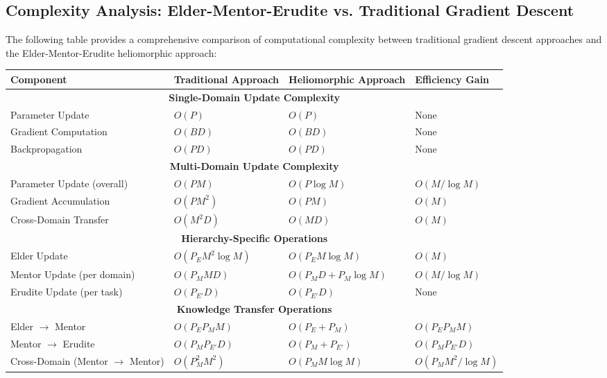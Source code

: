 \subsection{Complexity Analysis: Elder-Mentor-Erudite vs. Traditional Gradient Descent}

The following table provides a comprehensive comparison of computational complexity between traditional gradient descent approaches and the Elder-Mentor-Erudite heliomorphic approach:

\begin{table}[h]
\centering
\begin{tabular}{|p{3cm}|p{4.5cm}|p{4.5cm}|p{3cm}|}
\hline
\textbf{Component} & \textbf{Traditional Approach} & \textbf{Heliomorphic Approach} & \textbf{Efficiency Gain} \\
\hline
\multicolumn{4}{|c|}{\textbf{Single-Domain Update Complexity}} \\
\hline
Parameter Update & $O(P)$ & $O(P)$ & None \\
\hline
Gradient Computation & $O(BD)$ & $O(BD)$ & None \\
\hline
Backpropagation & $O(PD)$ & $O(PD)$ & None \\
\hline
\multicolumn{4}{|c|}{\textbf{Multi-Domain Update Complexity}} \\
\hline
Parameter Update (overall) & $O(PM)$ & $O(P \log M)$ & $O(M/\log M)$ \\
\hline
Gradient Accumulation & $O(PM^2)$ & $O(PM)$ & $O(M)$ \\
\hline
Cross-Domain Transfer & $O(M^2D)$ & $O(MD)$ & $O(M)$ \\
\hline
\multicolumn{4}{|c|}{\textbf{Hierarchy-Specific Operations}} \\
\hline
Elder Update & $O(P_E M^2 \log M)$ & $O(P_E M \log M)$ & $O(M)$ \\
\hline
Mentor Update (per domain) & $O(P_M M D)$ & $O(P_M D + P_M \log M)$ & $O(M/\log M)$ \\
\hline
Erudite Update (per task) & $O(P_{E'} D)$ & $O(P_{E'} D)$ & None \\
\hline
\multicolumn{4}{|c|}{\textbf{Knowledge Transfer Operations}} \\
\hline
Elder $\to$ Mentor & $O(P_E P_M M)$ & $O(P_E + P_M)$ & $O(P_E P_M M)$ \\
\hline
Mentor $\to$ Erudite & $O(P_M P_{E'} D)$ & $O(P_M + P_{E'})$ & $O(P_M P_{E'} D)$ \\
\hline
Cross-Domain (Mentor $\to$ Mentor) & $O(P_M^2 M^2)$ & $O(P_M M \log M)$ & $O(P_M M^2/\log M)$ \\

\end{tabular}
\end{table}
